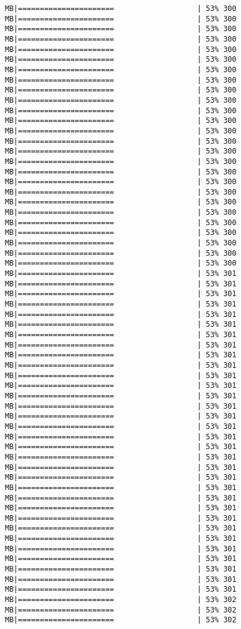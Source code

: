 \documentclass[
]{article}
\begin{document}
\begin{verbatim}
MB|======================                   | 53% 300 MB|======================                   | 53% 300 MB|======================                   | 53% 300 MB|======================                   | 53% 300 MB|======================                   | 53% 300 MB|======================                   | 53% 300 MB|======================                   | 53% 300 MB|======================                   | 53% 300 MB|======================                   | 53% 300 MB|======================                   | 53% 300 MB|======================                   | 53% 300 MB|======================                   | 53% 300 MB|======================                   | 53% 300 MB|======================                   | 53% 300 MB|======================                   | 53% 300 MB|======================                   | 53% 300 MB|======================                   | 53% 300 MB|======================                   | 53% 300 MB|======================                   | 53% 300 MB|======================                   | 53% 300 MB|======================                   | 53% 300 MB|======================                   | 53% 300 MB|======================                   | 53% 300 MB|======================                   | 53% 300 MB|======================                   | 53% 300 MB|======================                   | 53% 300 MB|======================                   | 53% 301 MB|======================                   | 53% 301 MB|======================                   | 53% 301 MB|======================                   | 53% 301 MB|======================                   | 53% 301 MB|======================                   | 53% 301 MB|======================                   | 53% 301 MB|======================                   | 53% 301 MB|======================                   | 53% 301 MB|======================                   | 53% 301 MB|======================                   | 53% 301 MB|======================                   | 53% 301 MB|======================                   | 53% 301 MB|======================                   | 53% 301 MB|======================                   | 53% 301 MB|======================                   | 53% 301 MB|======================                   | 53% 301 MB|======================                   | 53% 301 MB|======================                   | 53% 301 MB|======================                   | 53% 301 MB|======================                   | 53% 301 MB|======================                   | 53% 301 MB|======================                   | 53% 301 MB|======================                   | 53% 301 MB|======================                   | 53% 301 MB|======================                   | 53% 301 MB|======================                   | 53% 301 MB|======================                   | 53% 301 MB|======================                   | 53% 301 MB|======================                   | 53% 301 MB|======================                   | 53% 301 MB|======================                   | 53% 301 MB|======================                   | 53% 302 MB|======================                   | 53% 302 MB|======================                   | 53% 302 
\end{verbatim}
\end{document}
